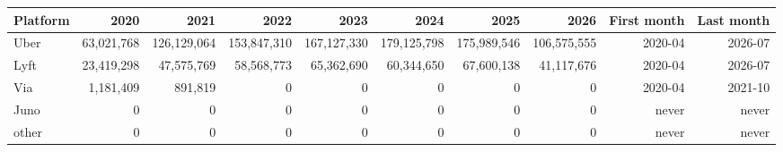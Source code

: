 \begin{tabular}{lrrrrrrrrr}
\toprule
Platform & 2020 & 2021 & 2022 & 2023 & 2024 & 2025 & 2026 & First month & Last month \\
\midrule
Uber & 63,021,768 & 126,129,064 & 153,847,310 & 167,127,330 & 179,125,798 & 175,989,546 & 106,575,555 & 2020-04 & 2026-07 \\
Lyft & 23,419,298 & 47,575,769 & 58,568,773 & 65,362,690 & 60,344,650 & 67,600,138 & 41,117,676 & 2020-04 & 2026-07 \\
Via & 1,181,409 & 891,819 & 0 & 0 & 0 & 0 & 0 & 2020-04 & 2021-10 \\
Juno & 0 & 0 & 0 & 0 & 0 & 0 & 0 & never & never \\
other & 0 & 0 & 0 & 0 & 0 & 0 & 0 & never & never \\
\bottomrule
\end{tabular}
